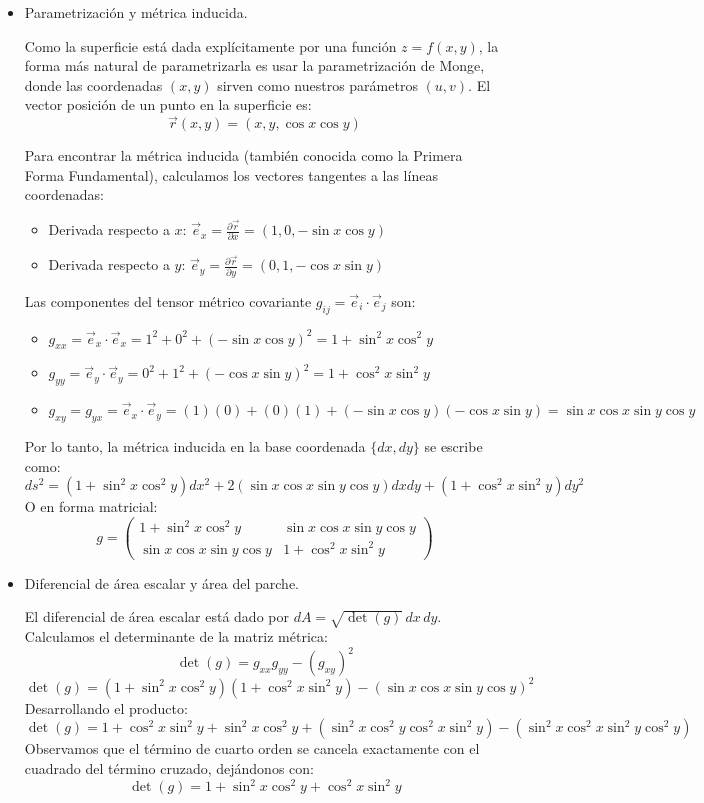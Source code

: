 \documentclass[11pt,spanish]{article}
\begin{document}
\begin{itemize}
\item Parametrización y métrica inducida.

Como la superficie está dada explícitamente por una función $z = f(x,y)$, la forma más natural de parametrizarla es usar la parametrización de Monge, donde las coordenadas $(x,y)$ sirven como nuestros parámetros $(u,v)$.
El vector posición de un punto en la superficie es:
$$\vec{r}(x,y) = (x, y, \cos x \cos y)$$

Para encontrar la métrica inducida (también conocida como la Primera Forma Fundamental), calculamos los vectores tangentes a las líneas coordenadas:
\begin{itemize}
\item Derivada respecto a $x$: $\vec{e}_x = \frac{\partial \vec{r}}{\partial x} = (1, 0, -\sin x \cos y)$
\item Derivada respecto a $y$: $\vec{e}_y = \frac{\partial \vec{r}}{\partial y} = (0, 1, -\cos x \sin y)$
\end{itemize}

Las componentes del tensor métrico covariante $g_{ij} = \vec{e}_i \cdot \vec{e}_j$ son:
\begin{itemize}
\item $g_{xx} = \vec{e}_x \cdot \vec{e}_x = 1^2 + 0^2 + (-\sin x \cos y)^2 = 1 + \sin^2 x \cos^2 y$
\item $g_{yy} = \vec{e}_y \cdot \vec{e}_y = 0^2 + 1^2 + (-\cos x \sin y)^2 = 1 + \cos^2 x \sin^2 y$
\item $g_{xy} = g_{yx} = \vec{e}_x \cdot \vec{e}_y = (1)(0) + (0)(1) + (-\sin x \cos y)(-\cos x \sin y) = \sin x \cos x \sin y \cos y$
\end{itemize}

Por lo tanto, la métrica inducida en la base coordenada $\{dx, dy\}$ se escribe como:
$$
ds^2 = (1 + \sin^2 x \cos^2 y) dx^2 + 2(\sin x \cos x \sin y \cos y) dx dy + (1 + \cos^2 x \sin^2 y) dy^2
$$
O en forma matricial:
$$
g = \begin{pmatrix} 1 + \sin^2 x \cos^2 y & \sin x \cos x \sin y \cos y \\ \sin x \cos x \sin y \cos y & 1 + \cos^2 x \sin^2 y \end{pmatrix}
$$

\item Diferencial de área escalar y área del parche.

El diferencial de área escalar está dado por $dA = \sqrt{\det(g)} \, dx \, dy$.
Calculamos el determinante de la matriz métrica:
$$
\det(g) = g_{xx} g_{yy} - (g_{xy})^2
$$
$$
\det(g) = (1 + \sin^2 x \cos^2 y)(1 + \cos^2 x \sin^2 y) - (\sin x \cos x \sin y \cos y)^2
$$
Desarrollando el producto:
$$
\det(g) = 1 + \cos^2 x \sin^2 y + \sin^2 x \cos^2 y + (\sin^2 x \cos^2 y \cos^2 x \sin^2 y) - (\sin^2 x \cos^2 x \sin^2 y \cos^2 y)
$$
Observamos que el término de cuarto orden se cancela exactamente con el cuadrado del término cruzado, dejándonos con:
$$
\det(g) = 1 + \sin^2 x \cos^2 y + \cos^2 x \sin^2 y
$$


\end{itemize}
\end{document}
